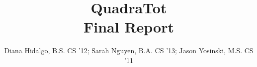\documentclass[11pt,letterpaper]{article}
\title{QuadraTot \\
{\normalsize \sc Final Report}}
\author{Diana Hidalgo, B.S. CS '12; Sarah Nguyen, B.A. CS '13; Jason Yosinski, M.S. CS '11 \\
\code{\{djh283,smn64,jy495\}@cornell.edu}}
\begin{document}
\maketitle
\normalem

\begin{abstract}

\end{abstract}




\end{document}
